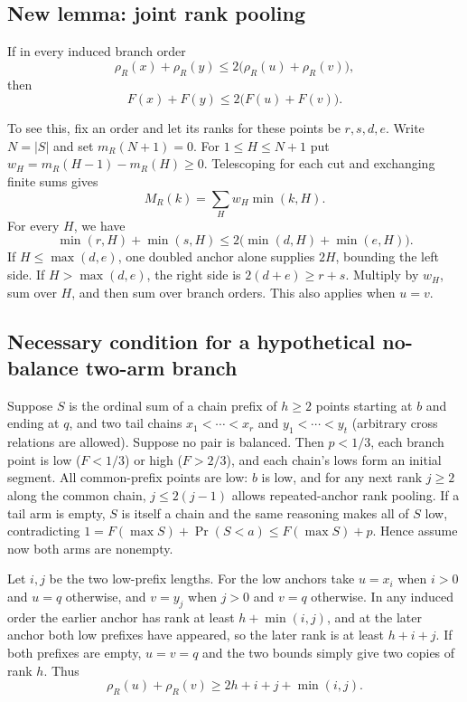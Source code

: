 \documentclass[
  11pt,
]{article}
\begin{document}
\subsection{New lemma: joint rank
pooling}\label{new-lemma-joint-rank-pooling}

If in every induced branch order \[
 \rho_R(x)+\rho_R(y)\le 2\bigl(\rho_R(u)+\rho_R(v)\bigr),
\] then \[
 F(x)+F(y)\le2\bigl(F(u)+F(v)\bigr).
\]

To see this, fix an order and let its ranks for these points be
\(r,s,d,e\). Write \(N=|S|\) and set \(m_R(N+1)=0\). For
\(1\le H\le N+1\) put \(w_H=m_R(H-1)-m_R(H)\ge0\). Telescoping for each
cut and exchanging finite sums gives \[
 M_R(k)=\sum_H w_H\min(k,H).
\] For every \(H\), we have \[
 \min(r,H)+\min(s,H)\le2\bigl(\min(d,H)+\min(e,H)\bigr).
\] If \(H\le\max(d,e)\), one doubled anchor alone supplies \(2H\),
bounding the left side. If \(H>\max(d,e)\), the right side is
\(2(d+e)\ge r+s\). Multiply by \(w_H\), sum over \(H\), and then sum
over branch orders. This also applies when \(u=v\).

\subsection{Necessary condition for a hypothetical no-balance two-arm
branch}\label{necessary-condition-for-a-hypothetical-no-balance-two-arm-branch}

Suppose \(S\) is the ordinal sum of a chain prefix of \(h\ge2\) points
starting at \(b\) and ending at \(q\), and two tail chains
\(x_1<\cdots<x_r\) and \(y_1<\cdots<y_t\) (arbitrary cross relations are
allowed). Suppose no pair is balanced. Then \(p<1/3\), each branch point
is low (\(F<1/3\)) or high (\(F>2/3\)), and each chain's lows form an
initial segment. All common-prefix points are low: \(b\) is low, and for
any next rank \(j\ge2\) along the common chain, \(j\le2(j-1)\) allows
repeated-anchor rank pooling. If a tail arm is empty, \(S\) is itself a
chain and the same reasoning makes all of \(S\) low, contradicting
\(1=F(\max S)+\Pr(S<a)\le F(\max S)+p\). Hence assume now both arms are
nonempty.

Let \(i,j\) be the two low-prefix lengths. For the low anchors take
\(u=x_i\) when \(i>0\) and \(u=q\) otherwise, and \(v=y_j\) when \(j>0\)
and \(v=q\) otherwise. In any induced order the earlier anchor has rank
at least \(h+\min(i,j)\), and at the later anchor both low prefixes have
appeared, so the later rank is at least \(h+i+j\). If both prefixes are
empty, \(u=v=q\) and the two bounds simply give two copies of rank
\(h\). Thus \[
 \rho_R(u)+\rho_R(v)\ge2h+i+j+\min(i,j).                    \tag{1}
\]
\end{document}

